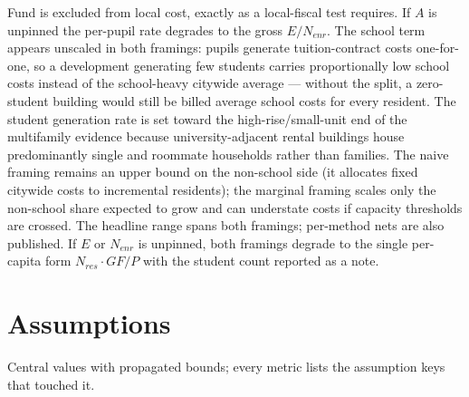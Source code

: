 \documentclass[11pt]{article}
\begin{document}
Fund is excluded from local cost, exactly as a local-fiscal test requires.
If $A$ is unpinned the per-pupil rate degrades to the gross $E / N_{enr}$.
The school term appears unscaled in both framings: pupils generate tuition-contract
costs one-for-one, so a development generating few students carries
proportionally low school costs instead of the school-heavy citywide average
--- without the split, a zero-student building would still be billed average
school costs for every resident. The student generation rate is set toward the
high-rise/small-unit end of the multifamily evidence \cite{listokin2006}
because university-adjacent rental buildings house predominantly single and
roommate households rather than families. The naive framing remains an upper
bound on the non-school side (it allocates fixed citywide costs to incremental
residents); the marginal framing scales only the non-school share expected to
grow and can understate costs if capacity thresholds are crossed. The headline
range spans both framings; per-method nets are also published. If $E$ or
$N_{enr}$ is unpinned, both framings degrade to the single per-capita form
$N_{res} \cdot GF/P$ with the student count reported as a note.

\section{Assumptions}

Central values with propagated bounds; every metric lists the assumption keys
that touched it.
\end{document}
